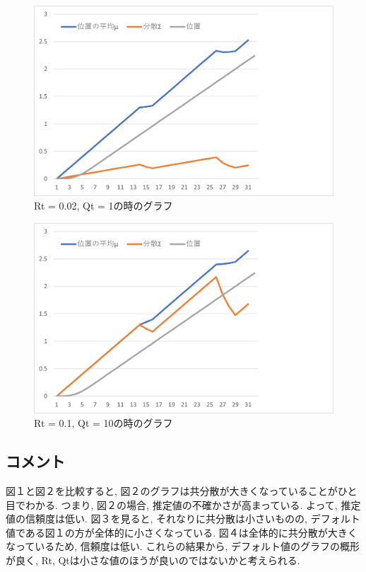\documentclass{jsarticle}
\begin{document}
\begin{figure}[H]
  \centering
   \includegraphics[scale=0.15]{./fig/Q=1.png}
   \caption{Rt = 0.02, Qt = 1の時のグラフ}
\end{figure}

\begin{figure}[H]
  \centering
   \includegraphics[scale=0.15]{./fig/R=0.1_Q=10.png}
   \caption{Rt = 0.1, Qt = 10の時のグラフ}
\end{figure}

\subsection*{コメント}
図１と図２を比較すると, 図２のグラフは共分散が大きくなっていることがひと目でわかる.
つまり, 図２の場合, 推定値の不確かさが高まっている. よって, 推定値の信頼度は低い.
図３を見ると, それなりに共分散は小さいものの, デフォルト値である図１の方が全体的に小さくなっている.
図４は全体的に共分散が大きくなっているため, 信頼度は低い. これらの結果から, デフォルト値のグラフの概形が良く, 
Rt, Qtは小さな値のほうが良いのではないかと考えられる.
\end{document}
